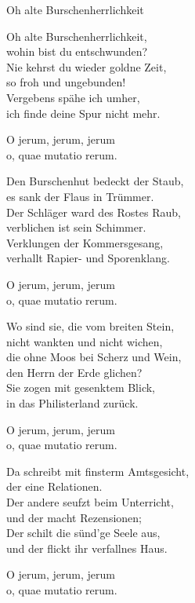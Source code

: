 \begin{song}{Oh alte Burschenherrlichkeit}


    \showversenumber	
	Oh alte Burschenherrlichkeit,\\
	wohin bist du entschwunden?\\
	Nie kehrst du wieder goldne Zeit,\\
	so froh und ungebunden!\\
	Vergebens spähe ich umher,\\
	ich finde deine Spur nicht mehr.\\
	\begin{repetition}
		O jerum, jerum, jerum\\
		o, quae mutatio rerum.
	\end{repetition}
	
    \showversenumber
	Den Burschenhut bedeckt der Staub,\\
	es sank der Flaus in Trümmer.\\
	Der Schläger ward des Rostes Raub,\\
	verblichen ist sein Schimmer.\\
	Verklungen der Kommersgesang,\\
	verhallt Rapier- und Sporenklang.\\
	\begin{repetition}
		O jerum, jerum, jerum\\
		o, quae mutatio rerum.
	\end{repetition}
	
    \showversenumber
	Wo sind sie, die vom breiten Stein,\\
	nicht wankten und nicht wichen,\\
	die ohne Moos bei Scherz und Wein,\\
	den Herrn der Erde glichen?\\
	Sie zogen mit gesenktem Blick,\\
	in das Philisterland zurück.\\
	\begin{repetition}
		O jerum, jerum, jerum\\
		o, quae mutatio rerum.
	\end{repetition}
	
    \showversenumber
	Da schreibt mit finsterm Amtsgesicht,\\
	der eine Relationen.\\
	Der andere seufzt beim Unterricht,\\
	und der macht Rezensionen;\\
	Der schilt die sünd'ge Seele aus,\\
	und der flickt ihr verfallnes Haus.\\
	\begin{repetition}
		O jerum, jerum, jerum\\
		o, quae mutatio rerum.
	\end{repetition}
	

\end{song}

